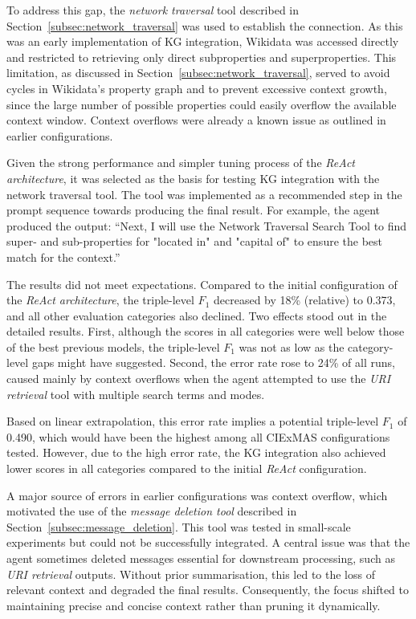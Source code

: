 \documentclass[a4paper,oneside,bibliography=totoc]{scrbook}
\begin{document}
To address this gap, the \textit{network traversal} tool described in Section~\ref{subsec:network_traversal} was used to establish the connection. As this was an early implementation of \ac{KG} integration, Wikidata was accessed directly and restricted to retrieving only direct subproperties and superproperties. This limitation, as discussed in Section~\ref{subsec:network_traversal}, served to avoid cycles in Wikidata’s property graph and to prevent excessive context growth, since the large number of possible properties could easily overflow the available context window. Context overflows were already a known issue as outlined in earlier configurations.

Given the strong performance and simpler tuning process of the \textit{ReAct architecture}, it was selected as the basis for testing \ac{KG} integration with the network traversal tool. The tool was implemented as a recommended step in the prompt sequence towards producing the final result. For example, the agent produced the output: \enquote{Next, I will use the Network Traversal Search Tool to find super- and sub-properties for "located in" and "capital of" to ensure the best match for the context.}

The results did not meet expectations. Compared to the initial configuration of the \textit{ReAct architecture}, the triple-level $F_{1}$ decreased by 18\% (relative) to 0.373, and all other evaluation categories also declined. Two effects stood out in the detailed results. First, although the scores in all categories were well below those of the best previous models, the triple-level $F_{1}$ was not as low as the category-level gaps might have suggested. Second, the error rate rose to 24\% of all runs, caused mainly by context overflows when the agent attempted to use the \textit{\ac{URI} retrieval} tool with multiple search terms and modes.

Based on linear extrapolation, this error rate implies a potential triple-level $F_{1}$ of 0.490, which would have been the highest among all CIExMAS configurations tested. However, due to the high error rate, the \ac{KG} integration also achieved lower scores in all categories compared to the initial \textit{ReAct} configuration.

A major source of errors in earlier configurations was context overflow, which motivated the use of the \textit{message deletion tool} described in Section~\ref{subsec:message_deletion}. This tool was tested in small-scale experiments but could not be successfully integrated. A central issue was that the agent sometimes deleted messages essential for downstream processing, such as \textit{\ac{URI} retrieval} outputs. Without prior summarisation, this led to the loss of relevant context and degraded the final results. Consequently, the focus shifted to maintaining precise and concise context rather than pruning it dynamically.
\end{document}
